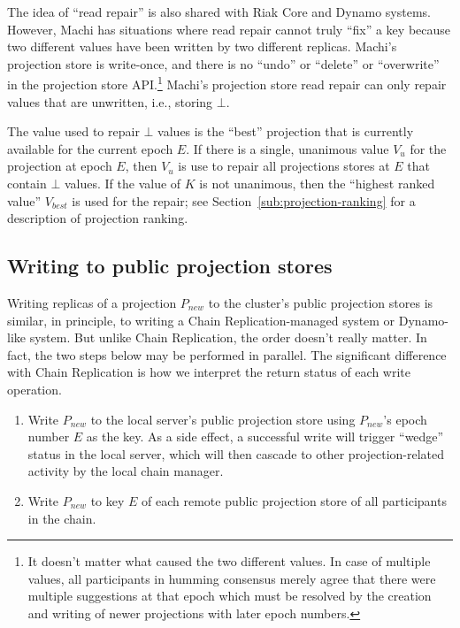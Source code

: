 \documentclass[preprint,10pt]{sigplanconf}
\begin{document}
The idea of ``read repair'' is also shared with Riak Core and Dynamo
systems.  However, Machi has situations where read repair cannot truly
``fix'' a key because two different values have been written by two
different replicas.
Machi's projection store is write-once, and there is no ``undo'' or
``delete'' or ``overwrite'' in the projection store API.\footnote{It doesn't
matter what caused the two different values.  In case of multiple
values, all participants in humming consensus merely agree that there
were multiple suggestions at that epoch which must be resolved by the
creation and writing of newer projections with later epoch numbers.}
Machi's projection store read repair can only repair values that are
unwritten, i.e., storing $\bot$.

The value used to repair $\bot$ values is the ``best'' projection that
is currently available for the current epoch $E$.  If there is a single,
unanimous value $V_{u}$ for the projection at epoch $E$, then $V_{u}$
is use to repair all projections stores at $E$ that contain $\bot$
values.  If the value of $K$ is not unanimous, then the ``highest
ranked value'' $V_{best}$ is used for the repair; see
Section~\ref{sub:projection-ranking} for a description of projection
ranking.

\subsection{Writing to public projection stores}
\label{sub:proj-store-writing}

Writing replicas of a projection $P_{new}$ to the cluster's public
projection stores is similar, in principle, to writing a Chain
Replication-managed system or Dynamo-like system.  But unlike Chain
Replication, the order doesn't really matter.
In fact, the two steps below may be performed in parallel.
The significant difference with Chain Replication is how we interpret
the return status of each write operation.

\begin{enumerate}
\item Write $P_{new}$ to the local server's public projection store
  using $P_{new}$'s epoch number $E$ as the key.
  As a side effect, a successful write will trigger
  ``wedge'' status in the local server, which will then cascade to other
  projection-related activity by the local chain manager.
\item Write $P_{new}$ to key $E$ of each remote public projection store of
  all participants in the chain.
\end{enumerate}
\end{document}

